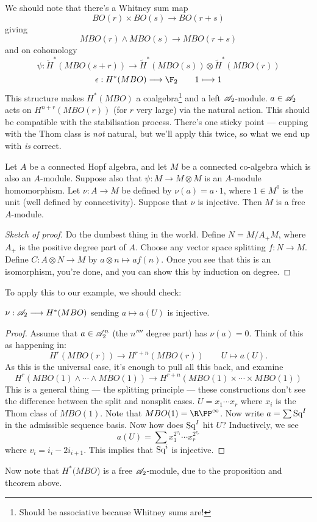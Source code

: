 \documentclass[11pt]{article}
\begin{document}
\begin{JeremyThomTalk}
We should note that there's a Whitney sum map 
\[BO(r)\times BO(s)\to BO(r+s)\]
giving
\[MBO(r)\wedge MBO(s)\to MBO(r+s)\]
and on cohomology
\[\psi:\widetilde H^* (MBO(s+r))\to \widetilde H^*( MBO(s))\otimes \widetilde H^* (MBO(r))\]
\[\epsilon: H^*(MBO)\to\F_2\qquad 1\mapsto 1\]
This structure makes $H^*(MBO)$ a coalgebra\footnote{Should be associative because Whitney sums are!} and a left $\mathscr{A}_2$-module. $a\in\mathscr{A}_2$ acts on $H^{n+r}(MBO(r))$ (for $r$ very large) via the natural action. This should be compatible with the stabilisation process. There's one sticky point --- cupping with the Thom class is \emph{not} natural, but we'll apply this twice, so what we end up with \emph{is} correct.
\begin{thm*}
Let $A$ be a connected Hopf algebra, and let $M$ be a connected co-algebra which is also an $A$-module. Suppose also that $\psi:M\to M\otimes M$ is an $A$-module homomorphism. Let $\nu:A\to M$ be defined by $\nu(a)=a\cdot1$, where $1\in M^0$ is the unit (well defined by connectivity). Suppose that $\nu$ is injective. Then $M$ is a free $A$-module.
\end{thm*}
\begin{proof}[Sketch of proof]
Do the dumbest thing in the world. Define $N=M/A_+M$, where $A_+$ is the positive degree part of $A$. Choose any vector space splitting $f:N\to M$. Define $C:A\otimes N\to M$ by $a\otimes n\mapsto af(n)$. Once you see that this is an isomorphism, you're done, and you can show this by induction on degree.
\end{proof}
\noindent To apply this to our example, we should check:
\begin{prop*}
$\nu:\mathscr{A}_2\longrightarrow H^*(MBO)$ sending $a\mapsto a(U)$ is injective.
\end{prop*}
\begin{proof}
Assume that $a\in\mathscr{A}_2^n$ (the $n\fourth$ degree part) has $\nu(a)=0$. Think of this as happening in:
\[H^r(MBO(r))\to H^{r+n}(MBO(r))\qquad U\mapsto a(U).\]
As this is the universal case, it's enough to pull all this back, and examine
\[H^r(MBO(1)\wedge\cdots\wedge MBO(1))\to H^{r+n}(MBO(1)\times\cdots\times MBO(1))\]
This is a general thing --- the splitting principle --- these constructions don't see the difference between the split and nonsplit cases. $U=x_1\cdots x_r$ where $x_i$ is the Thom class of $MBO(1)$. Note that $MBO(1)=\RP^\infty$. Now write $a=\sum \textup{Sq}^I$ in the admissible sequence basis. Now how does $\textup{Sq}^I$ hit $U$? Inductively, we see
\[a(U)=\sum x_1^{2^{v_1}}\cdots x_r^{2^{v_r}}\]
where $v_i=i_i-2i_{i+1}$. This implies that $\textup{Sq}^i$ is injective.
\end{proof}
 Now note that $H^*(MBO$) is a free $\mathscr{A}_2$-module, due to the proposition and theorem above.

\end{JeremyThomTalk}
\end{document}
